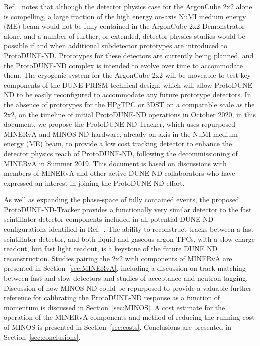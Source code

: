 Ref.~\cite{2x2@FNAL} notes that although the detector physics case for the ArgonCube 2x2 alone is compelling, a large fraction of the high energy on-axis NuMI medium energy (ME) beam would not be fully contained in the ArgonCube 2x2 Demonstrator alone, and a number of further, or extended, detector physics studies would be possible if and when additional subdetector prototypes are introduced to ProtoDUNE-ND. Prototypes for these detectors are currently being planned, and the ProtoDUNE-ND complex is intended to evolve over time to accommodate them. The cryogenic system for the ArgonCube 2x2 will be moveable to test key components of the DUNE-PRISM technical design, which will allow ProtoDUNE-ND to be easily reconfigured to accommodate any future prototype detectors. In the absence of prototypes for the HPgTPC or 3DST on a comparable scale as the 2x2, on the timeline of initial ProtoDUNE-ND operations in October 2020, in this document, we propose the ProtoDUNE-ND-Tracker, which uses repurposed MINERvA and MINOS-ND hardware, already on-axis in the NuMI medium energy (ME) beam, to provide a low cost tracking detector to enhance the detector physics reach of ProtoDUNE-ND, following the decommissioning of MINERvA in Summer 2019. This document is based on discussions with members of MINERvA and other active DUNE ND collaborators who have expressed an interest in joining the ProtoDUNE-ND effort.

As well as expanding the phase-space of fully contained events, the proposed ProtoDUNE-ND-Tracker provides a functionally very similar detector to the fast scintillator detector components included in all potential DUNE ND configurations identified in Ref.~\cite{dune_ndcsg}. The ability to reconstruct tracks between a fast scintillator detector, and both liquid and gaseous argon TPCs, with a slow charge readout, but fast light readout, is a keystone of the future DUNE ND reconstruction. Studies pairing the 2x2 with components of MINERvA are presented in Section~\ref{sec:MINERvA}, including a discussion on track matching between fast and slow detectors and studies of acceptance and neutron tagging. Discussion of how MINOS-ND could be repurposed to provide a valuable further reference for calibrating the ProtoDUNE-ND response as a function of momentum is discussed in Section~\ref{sec:MINOS}. A cost estimate for the operation of the MINERvA components and method of reducing the running cost of MINOS is presented in Section~\ref{sec:costs}. Conclusions are presented in Section~\ref{sec:conclusions}.

